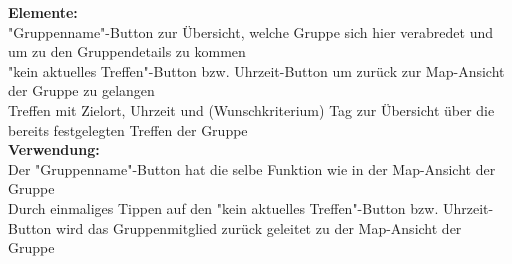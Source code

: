 \textbf{Elemente:}\\
"Gruppenname"-Button zur Übersicht, welche Gruppe sich hier verabredet und um zu den Gruppendetails zu kommen\\
"kein aktuelles Treffen"-Button bzw. Uhrzeit-Button um zurück zur Map-Ansicht der Gruppe zu gelangen\\
Treffen mit Zielort, Uhrzeit und (Wunschkriterium) Tag zur Übersicht über die bereits festgelegten Treffen der Gruppe\\
\textbf{Verwendung:}\\
Der "Gruppenname"-Button  hat die selbe Funktion wie in der Map-Ansicht der Gruppe\\
Durch einmaliges Tippen auf den "kein aktuelles Treffen"-Button bzw. Uhrzeit-Button wird das Gruppenmitglied zurück geleitet zu der Map-Ansicht der Gruppe\\ \\

